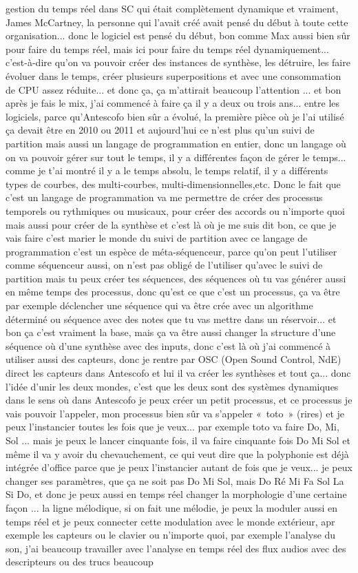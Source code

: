 gestion du temps réel dans SC qui était complètement dynamique et vraiment, James McCartney, la personne qui l'avait créé avait pensé du début à toute cette organisation... donc le logiciel est pensé du début, bon comme Max aussi bien sûr pour faire du temps réel, mais ici pour faire du temps réel dynamiquement... c'est-à-dire qu'on va pouvoir créer des instances de synthèse, les détruire, les faire évoluer dans le temps, créer plusieurs superpositions et avec une consommation de CPU assez réduite... et donc ça, ça m'attirait beaucoup l'attention ... et bon après je fais le mix, j'ai commencé à faire ça il y a deux ou trois ans... entre les logiciels, parce qu'Antescofo bien sûr a évolué, la première pièce où je l'ai utilisé ça devait être en 2010 ou 2011 et aujourd'hui ce n'est plus qu'un suivi de partition mais aussi un langage de programmation en entier, donc un langage où on va pouvoir gérer sur tout le temps, il y a différentes façon de gérer le temps... comme je t'ai montré il y a le temps absolu, le temps relatif, il y a différents types de courbes, des multi-courbes, multi-dimensionnelles,etc. Donc le fait que c'est un langage de programmation va me permettre de créer des processus temporels ou rythmiques ou musicaux, pour créer des accords ou n'importe quoi mais aussi pour créer de la synthèse et c'est là où je me suis dit bon, ce que je vais faire c'est marier le monde du suivi de partition avec ce langage de programmation c'est un espèce de méta-séquenceur, parce qu'on peut l'utiliser comme séquenceur aussi, on n'est pas obligé de l'utiliser qu'avec le suivi de partition mais tu peux créer tes séquences, des séquences où tu vas générer aussi en même temps des processus, donc qu'est ce que c'est un processus, ça va être par exemple déclencher une séquence qui va être crée avec un algorithme déterminé ou séquence avec des notes que tu vas mettre dans un réservoir... et bon ça c'est vraiment la base, mais ça va être aussi changer la structure d'une séquence où d'une synthèse avec des inputs, donc c'est là où j'ai commencé à utiliser aussi des capteurs, donc je rentre par OSC (Open Sound Control, NdE) direct les capteurs dans Antescofo et lui il va créer les synthèses et tout ça... donc l'idée d'unir les deux mondes, c'est que les deux sont des systèmes dynamiques dans le sens où dans Antescofo je peux créer un petit processus, et ce processus je vais pouvoir l'appeler, mon processus bien sûr va s'appeler « toto » (rires) et je peux l'instancier toutes les fois que je veux... par exemple toto va faire Do, Mi, Sol ... mais je peux le lancer cinquante fois, il va faire cinquante fois Do Mi Sol et même il va y avoir du chevauchement, ce qui veut dire que la polyphonie est déjà intégrée d'office parce que je peux l'instancier autant de fois que je veux... je peux changer ses paramètres, que ça ne soit pas Do Mi Sol, mais Do Ré Mi Fa Sol La Si Do, et donc je peux aussi en temps réel changer la morphologie d'une certaine façon ... la ligne mélodique, si on fait une mélodie, je peux la moduler aussi en temps réel et je peux connecter cette modulation avec le monde extérieur, apr exemple les capteurs ou le clavier ou n'importe quoi, par exemple l'analyse du son, j'ai beaucoup travailler avec l'analyse en temps réel des flux audios avec des descripteurs ou des trucs beaucoup 